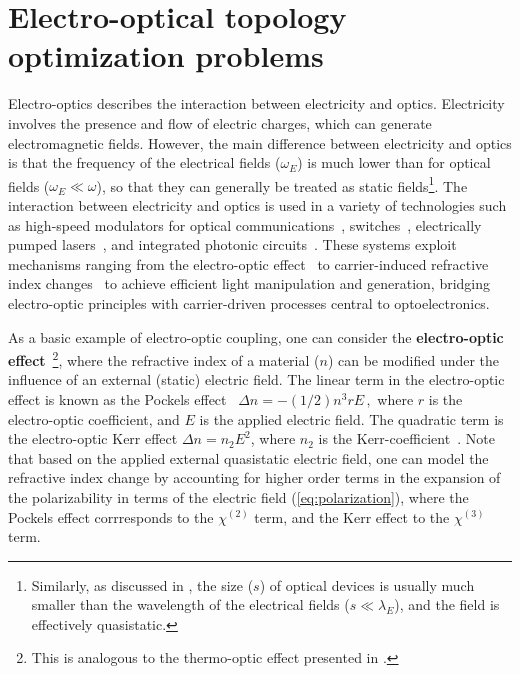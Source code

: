 \chapter{Electro-optical topology optimization problems}\label{chap:eo}
Electro-optics describes the interaction between electricity and optics. Electricity involves the presence and flow of electric charges, which can generate electromagnetic fields.
However, the main difference between electricity and optics is that the frequency of the electrical fields ($\omega_E$)
is much lower than for optical fields ($\omega_E \ll \omega $), so that they can generally be treated as static fields\footnote{Similarly, as discussed in , the size ($s$) of optical devices
is usually much smaller than the wavelength of the electrical fields ($s\ll \lambda_E $), and the field is effectively quasistatic.}.
The interaction between electricity and optics is used in a variety of technologies such as high-speed modulators for optical communications~\cite{modu, modu1, modu2, pockels}, switches~\cite{eo_switch}, electrically pumped lasers~\cite{laser,laser_pic}, and integrated photonic circuits~\cite{laser_pic}. 
These systems exploit mechanisms ranging from the electro-optic effect~\cite{eo_effect} to carrier-induced refractive index
 changes~\cite{c_i_n} to achieve efficient light manipulation and generation, bridging electro-optic principles with carrier-driven processes central to optoelectronics.

As a basic example of electro-optic coupling, one can consider the \textbf{electro-optic effect}~\cite{eo_effect}\footnote{This is analogous to the thermo-optic effect presented in .},
where the refractive index of a material ($n$) can be modified under the influence of an external (static) electric field. The linear term in the electro-optic effect is known as the
Pockels effect~\cite{pockels} $
    \Delta n = -(1/2) n^3 r E\,,$
where $r$ is the electro-optic coefficient, and $E$ is the applied electric field. The quadratic term 
is the electro-optic Kerr effect $\Delta n = n_2 E^2$, where $n_2$ is the Kerr-coefficient~\cite{phot_crys}. Note that based on the applied external
quasistatic electric field, one can model the refractive index change by accounting for higher order terms in the expansion of the polarizability
in terms of the electric field (\eqref{eq:polarization}), where the Pockels effect corrresponds to the $\chi^{(2)}$ term, and the Kerr effect to the $\chi^{(3)}$ term.


